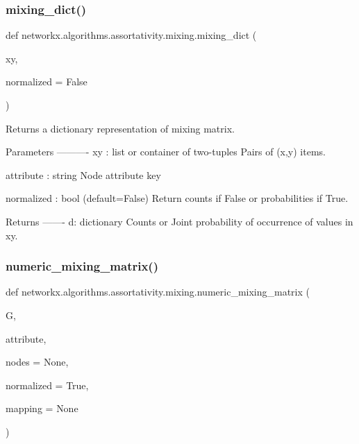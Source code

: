 \subsubsection{\texorpdfstring{mixing\+\_\+dict()}{mixing\_dict()}}
{\footnotesize\ttfamily def networkx.\+algorithms.\+assortativity.\+mixing.\+mixing\+\_\+dict (\begin{DoxyParamCaption}\item[{}]{xy,  }\item[{}]{normalized = {\ttfamily False} }\end{DoxyParamCaption})}

\begin{DoxyVerb}Returns a dictionary representation of mixing matrix.

Parameters
----------
xy : list or container of two-tuples
   Pairs of (x,y) items.

attribute : string
   Node attribute key

normalized : bool (default=False)
   Return counts if False or probabilities if True.

Returns
-------
d: dictionary
   Counts or Joint probability of occurrence of values in xy.
\end{DoxyVerb}
 \mbox{\label{namespacenetworkx_1_1algorithms_1_1assortativity_1_1mixing_a4e2807a27a561a47ca20518500b85cf3}} 
\subsubsection{\texorpdfstring{numeric\+\_\+mixing\+\_\+matrix()}{numeric\_mixing\_matrix()}}
{\footnotesize\ttfamily def networkx.\+algorithms.\+assortativity.\+mixing.\+numeric\+\_\+mixing\+\_\+matrix (\begin{DoxyParamCaption}\item[{}]{G,  }\item[{}]{attribute,  }\item[{}]{nodes = {\ttfamily None},  }\item[{}]{normalized = {\ttfamily True},  }\item[{}]{mapping = {\ttfamily None} }\end{DoxyParamCaption})}

